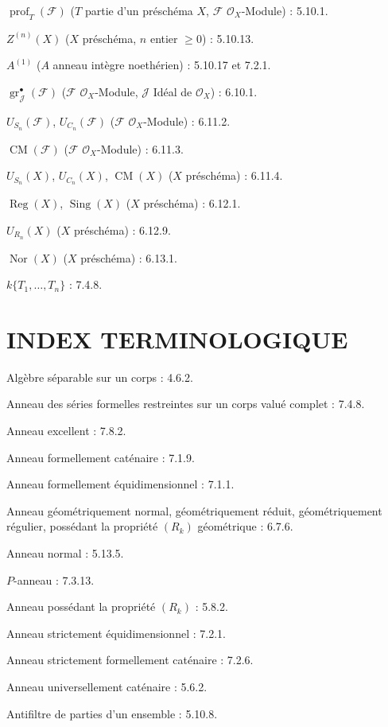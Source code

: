 \documentclass[10pt,oneside]{book}
\newcommand{\oldpage}[2][]{%
  \setcounter{footnote}{0}%
  \marginpar{\scriptsize\textbf{#1}~|~#2}\ignorespaces}
\begin{document}
$\operatorname{prof}_T(\mathscr F)$ ($T$ partie d'un préschéma $X$, $\mathscr F$
$\mathcal O_X$-Module) : 5.10.1.

$Z^{(n)}(X)$ ($X$ préschéma, $n$ entier $\geq0$) : 5.10.13.

$A^{(1)}$ ($A$ anneau intègre noethérien) : 5.10.17 et 7.2.1.

$\operatorname{gr}_{\mathscr J}^{\bullet}(\mathscr F)$ ($\mathscr F$
$\mathcal O_X$-Module, $\mathscr J$ Idéal de $\mathcal O_X$) : 6.10.1.

$U_{S_n}(\mathscr F)$, $U_{C_n}(\mathscr F)$ ($\mathscr F$
$\mathcal O_X$-Module) : 6.11.2.

$\operatorname{CM}(\mathscr F)$ ($\mathscr F$ $\mathcal O_X$-Module) : 6.11.3.

$U_{S_n}(X)$, $U_{C_n}(X)$, $\operatorname{CM}(X)$ ($X$ préschéma) : 6.11.4.

$\operatorname{Reg}(X)$, $\operatorname{Sing}(X)$ ($X$ préschéma) : 6.12.1.

$U_{R_n}(X)$ ($X$ préschéma) : 6.12.9.

$\operatorname{Nor}(X)$ ($X$ préschéma) : 6.13.1.

$k\{T_1,\ldots,T_n\}$ : 7.4.8.

\endgroup

\clearpage
\oldpage[IV-2]{226}
{}
\section*{INDEX TERMINOLOGIQUE}

\begingroup
\footnotesize
\setlength{\parindent}{0pt}
\setlength{\parskip}{1.1pt}
\newcommand{\EGAIVtwoTerm}[2]{#1 : #2.\par}

\EGAIVtwoTerm{Algèbre séparable sur un corps}{4.6.2}
\EGAIVtwoTerm{Anneau des séries formelles restreintes sur un corps valué complet}{7.4.8}
\EGAIVtwoTerm{Anneau excellent}{7.8.2}
\EGAIVtwoTerm{Anneau formellement caténaire}{7.1.9}
\EGAIVtwoTerm{Anneau formellement équidimensionnel}{7.1.1}
\EGAIVtwoTerm{Anneau géométriquement normal, géométriquement réduit,
géométriquement régulier, possédant la propriété $(R_k)$ géométrique}{6.7.6}
\EGAIVtwoTerm{Anneau normal}{5.13.5}
\EGAIVtwoTerm{$P$-anneau}{7.3.13}
\EGAIVtwoTerm{Anneau possédant la propriété $(R_k)$}{5.8.2}
\EGAIVtwoTerm{Anneau strictement équidimensionnel}{7.2.1}
\EGAIVtwoTerm{Anneau strictement formellement caténaire}{7.2.6}
\EGAIVtwoTerm{Anneau universellement caténaire}{5.6.2}
\EGAIVtwoTerm{Antifiltre de parties d'un ensemble}{5.10.8}
\end{document}
